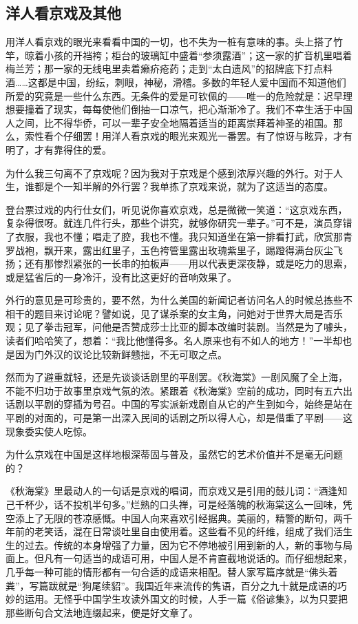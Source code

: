 \subsection{洋人看京戏及其他}

\par 用洋人看京戏的眼光来看看中国的一切，也不失为一桩有意味的事。头上搭了竹竿，晾着小孩的开裆袴；柜台的玻璃缸中盛着“参须露酒”；这一家的扩音机里唱着梅兰芳；那一家的无线电里卖着癞疥疮药；走到“太白遗风”的招牌底下打点料酒……这都是中国，纷纭，刺眼，神秘，滑稽。多数的年轻人爱中国而不知道他们所爱的究竟是一些什么东西。无条件的爱是可钦佩的——唯一的危险就是：迟早理想要撞着了现实，每每使他们倒抽一口凉气，把心渐渐冷了。我们不幸生活于中国人之间，比不得华侨，可以一辈子安全地隔着适当的距离崇拜着神圣的祖国。那么，索性看个仔细罢！用洋人看京戏的眼光来观光一番罢。有了惊讶与眩异，才有明了，才有靠得住的爱。
\par 为什么我三句离不了京戏呢？因为我对于京戏是个感到浓厚兴趣的外行。对于人生，谁都是个一知半解的外行罢？我单拣了京戏来说，就为了这适当的态度。
\par 登台票过戏的内行仕女们，听见说你喜欢京戏，总是微微一笑道：“这京戏东西，复杂得很呀。就连几件行头，那些个讲究，就够你研究一辈子。”可不是，演员穿错了衣服，我也不懂；唱走了腔，我也不懂。我只知道坐在第一排看打武，欣赏那青罗战袍，飘开来，露出红里子，玉色袴管里露出玫瑰紫里子，踢蹬得满台灰尘飞扬；还有那惨烈紧张的一长串的拍板声——用以代表更深夜静，或是吃力的思索，或是猛省后的一身冷汗，没有比这更好的音响效果了。
\par 外行的意见是可珍贵的，要不然，为什么美国的新闻记者访问名人的时候总拣些不相干的题目来讨论呢？譬如说，见了谋杀案的女主角，问她对于世界大局是否乐观；见了拳击冠军，问他是否赞成莎士比亚的脚本改编时装剧。当然是为了噱头，读者们哈哈笑了，想着：“我比他懂得多。名人原来也有不如人的地方！”一半却也是因为门外汉的议论比较新鲜戆拙，不无可取之点。
\par 然而为了避重就轻，还是先谈谈话剧里的平剧罢。《秋海棠》一剧风魔了全上海，不能不归功于故事里京戏气氛的浓。紧跟着《秋海棠》空前的成功，同时有五六出话剧以平剧的穿插为号召。中国的写实派新戏剧自从它的产生到如今，始终是站在平剧的对面的，可是第一出深入民间的话剧之所以得人心，却是借重了平剧——这现象委实使人吃惊。
\par 为什么京戏在中国是这样地根深蒂固与普及，虽然它的艺术价值并不是毫无问题的？
\par 《秋海棠》里最动人的一句话是京戏的唱词，而京戏又是引用的鼓儿词：“酒逢知己千杯少，话不投机半句多。”烂熟的口头禅，可是经落魄的秋海棠这么一回味，凭空添上了无限的苍凉感慨。中国人向来喜欢引经据典。美丽的，精警的断句，两千年前的老笑话，混在日常谈吐里自由使用着。这些看不见的纤维，组成了我们活生生的过去。传统的本身增强了力量，因为它不停地被引用到新的人，新的事物与局面上。但凡有一句适当的成语可用，中国人是不肯直截地说话的。而仔细想起来，几乎每一种可能的情形都有一句合适的成语来相配。替人家写篇序就是“佛头着粪”，写篇跋就是“狗尾续貂”。我国近年来流传的隽语，百分之九十就是成语的巧妙的运用。无怪乎中国学生攻读外国文的时候，人手一篇《俗谚集》，以为只要把那些断句合文法地连缀起来，便是好文章了。
